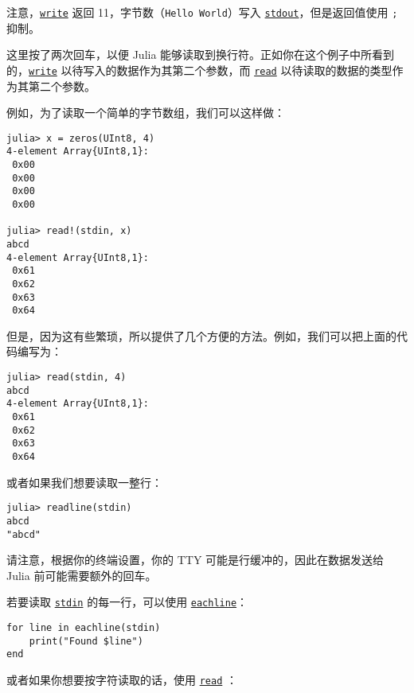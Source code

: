 注意，\hyperlink{16947913578760238729}{\texttt{write}} 返回 11，字节数（\texttt{{\textquotedbl}Hello World{\textquotedbl}}）写入 \hyperlink{18181294266083891471}{\texttt{stdout}}，但是返回值使用 \texttt{;} 抑制。



这里按了两次回车，以便 Julia 能够读取到换行符。正如你在这个例子中所看到的，\hyperlink{16947913578760238729}{\texttt{write}} 以待写入的数据作为其第二个参数，而 \hyperlink{8104134490906192097}{\texttt{read}} 以待读取的数据的类型作为其第二个参数。



例如，为了读取一个简单的字节数组，我们可以这样做：




\begin{verbatim}
julia> x = zeros(UInt8, 4)
4-element Array{UInt8,1}:
 0x00
 0x00
 0x00
 0x00

julia> read!(stdin, x)
abcd
4-element Array{UInt8,1}:
 0x61
 0x62
 0x63
 0x64
\end{verbatim}



但是，因为这有些繁琐，所以提供了几个方便的方法。例如，我们可以把上面的代码编写为：




\begin{verbatim}
julia> read(stdin, 4)
abcd
4-element Array{UInt8,1}:
 0x61
 0x62
 0x63
 0x64
\end{verbatim}



或者如果我们想要读取一整行：




\begin{verbatim}
julia> readline(stdin)
abcd
"abcd"
\end{verbatim}



请注意，根据你的终端设置，你的 TTY 可能是行缓冲的，因此在数据发送给 Julia 前可能需要额外的回车。



若要读取 \hyperlink{3330957653919693521}{\texttt{stdin}} 的每一行，可以使用 \hyperlink{3474649815265066504}{\texttt{eachline}}：




\begin{verbatim}
for line in eachline(stdin)
    print("Found $line")
end
\end{verbatim}



或者如果你想要按字符读取的话，使用 \hyperlink{8104134490906192097}{\texttt{read}} ：




